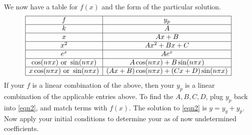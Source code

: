 \documentclass{article}
\begin{document}
We now have a table for $f(x)$ and the form of the particular solution.
\[
\begin{array}{|c|c|}
\hline
f & y_p\\\hline
k & A\\\hline
x & Ax+B\\\hline
x^2 & Ax^2+Bx+C\\\hline
e^x & Ae^x\\\hline
\cos(n\pi x) \text{ or } \sin(n\pi x) & A\cos(n\pi x) + B\sin(n\pi x)\\\hline
x\cos(n\pi x) \text{ or } \sin(n\pi x) & (Ax+B)\cos(n\pi x) + (Cx +D)\sin(n\pi x)\\\hline
\end{array}
\]
If your $f$ is a linear combination of the above, then your $y_p$ is a linear combination of the applicable entries above.
To find the $A,B,C,D$, plug $y_p$ back into \autoref{eqn2}, and match terms with $f(x)$.
The solution to \autoref{eqn2} is $y=y_g+y_p$.
Now apply your initial conditions to determine your as of now undetermined coefficients.
\end{document}

